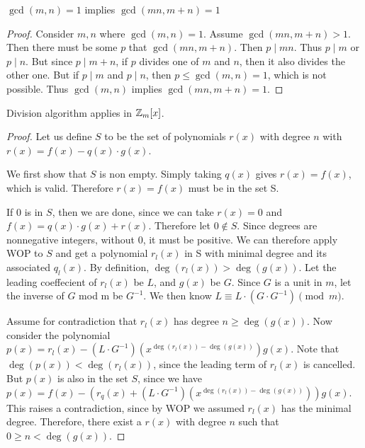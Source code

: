 \begin{theorem**}
    $\gcd(m, n) = 1$ implies $\gcd(mn, m+n) = 1$
\end{theorem**}
\begin{proof}
    Consider $m, n$ where $\gcd(m, n) = 1$. Assume $\gcd(mn, m+n) > 1$. Then there must be some $p$ that $\gcd(mn, m+n)$. Then $p \mid mn$. Thus $p \mid m$ or $p \mid n$. But since $p \mid m+n$, if $p$ divides one of $m$ and $n$, then it also divides the other one. But if $p \mid m$ and $p \mid n$, then $p \leq \gcd(m, n) = 1$, which is not possible. Thus $\gcd(m, n)$ implies $\gcd(mn, m+n) = 1$.
\end{proof}

\begin{theorem**}

    Division algorithm applies in $\mathbb{Z}_m[x]$.

\end{theorem**}

    \begin{proof}
    Let us define $S$ to be the set of polynomials $r(x)$ with degree $n$ with $r(x) = f(x) - q(x) \cdot g(x)$.

    We first show that $S$ is non empty. Simply taking $q(x)$ gives $r(x) = f(x)$, which is valid. Therefore $r(x)=f(x)$ must be in the set S.

    If $0$ is in $S$, then we are done, since we can take $r(x)=0$ and $f(x) = q(x) \cdot g(x)+r(x)$. Therefore let $0 \notin S$. Since degrees are nonnegative integers, without $0$, it must be positive. We can therefore apply WOP to $S$ and get a polynomial $r_l(x)$ in S with minimal degree and its associated $q_l(x)$. By definition, $\deg(r_l(x)) >  \deg(g(x))$. Let the leading coeffecient of $r_l(x)$ be $L$, and $g(x)$ be $G$. Since $G$ is a unit in $m$, let the inverse of $G$ mod m be $G^{-1}$. We then know $L \equiv L \cdot (G \cdot G^{-1}) \pmod m$.

    Assume for contradiction that $r_l(x)$ has degree $n \geq \deg(g(x))$. Now consider the polynomial $p(x) = r_l(x)-(L \cdot G^{-1})(x^{\deg(r_l(x))-\deg(g(x))})g(x)$. Note that $\deg(p(x)) < \deg(r_l(x))$, since the leading term of $r_l(x)$ is cancelled. But $p(x)$ is also in the set $S$, since we have $p(x) = f(x) - (r_q(x) +(L \cdot G^{-1})(x^{\deg(r_l(x))-\deg(g(x))}) )g(x)$. This raises a contradiction, since by WOP we assumed $r_l(x)$ has the minimal degree. Therefore, there exist a $r(x)$ with degree $n$ such that $0 \geq n < \deg(g(x))$.
\end{proof}